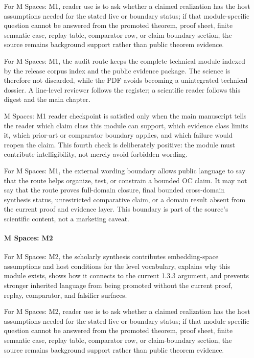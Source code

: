 For M Spaces: M1, reader use is to ask whether a claimed realization has the host assumptions needed for the stated live or boundary status; if that module-specific question cannot be answered from the promoted theorem, proof sheet, finite semantic case, replay table, comparator row, or claim-boundary section, the source remains background support rather than public theorem evidence.


For M Spaces: M1, the audit route keeps the complete technical module indexed by the release corpus index and the public evidence package. The science is therefore not discarded, while the PDF avoids becoming a unintegrated technical dossier. A line-level reviewer follows the register; a scientific reader follows this digest and the main chapter.


M Spaces: M1 reader checkpoint is satisfied only when the main manuscript tells the reader which claim class this module can support, which evidence class limits it, which prior-art or comparator boundary applies, and which failure would reopen the claim. This fourth check is deliberately positive: the module must contribute intelligibility, not merely avoid forbidden wording.


For M Spaces: M1, the external wording boundary allows public language to say that the route helps organize, test, or constrain a bounded OC claim. It may not say that the route proves full-domain closure, final bounded cross-domain synthesis status, unrestricted comparative claim, or a domain result absent from the current proof and evidence layer. This boundary is part of the source's scientific content, not a marketing caveat.


\paragraph{M Spaces: M2}

For M Spaces: M2, the scholarly synthesis contributes embedding-space assumptions and host conditions for the level vocabulary, explains why this module exists, shows how it connects to the current 1.3.3 argument, and prevents stronger inherited language from being promoted without the current proof, replay, comparator, and falsifier surfaces.


For M Spaces: M2, reader use is to ask whether a claimed realization has the host assumptions needed for the stated live or boundary status; if that module-specific question cannot be answered from the promoted theorem, proof sheet, finite semantic case, replay table, comparator row, or claim-boundary section, the source remains background support rather than public theorem evidence.



